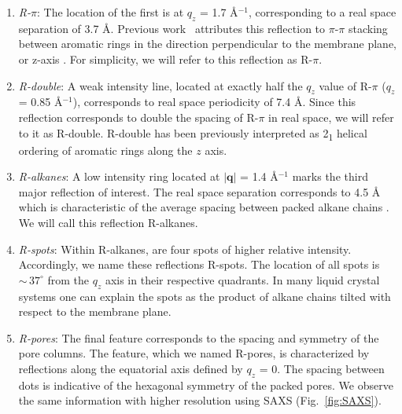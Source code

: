 \documentclass[journal=jpcbfk,manuscript=article]{achemso}
\begin{document}
  \begin{enumerate} 
  
	\item \textit{R-$\pi$}: The location of the first is at $q_z$ = 1.7
	\AA$^{-1}$, corresponding to a real space separation of 3.7 {\AA}. Previous
	work~\cite{feng_scalable_2014} attributes this reflection to $\pi$-$\pi$
	stacking between aromatic rings in the direction perpendicular to the membrane
	plane, or z-axis \cite{feng_scalable_2014}. For simplicity, we will refer to
	this reflection as R-$\pi$.
 
	\item \textit{R-double}: A weak intensity line, located at exactly half
	the $q_z$ value of R-$\pi$ ($q_z$ = 0.85 \AA$^{-1}$), corresponds to real
	space periodicity of 7.4 \AA. Since this reflection corresponds to double
	the spacing of R-$\pi$ in real space, we will refer to it as R-double. 
	R-double has been previously interpreted as 2\textsubscript{1} helical ordering of aromatic
	rings along the $z$ axis\cite{feng_scalable_2014}.

	\item \textit{R-alkanes}: A low intensity ring located at $|\mathbf{q}|$ = 1.4
	\AA$^{-1}$ marks the third major reflection of interest. The real space
	separation corresponds to 4.5 \AA~ which is characteristic of the average
	spacing between packed alkane chains \cite{mcintosh_organization_1980}. We will
	call this reflection R-alkanes.

	\item \textit{R-spots}: Within R-alkanes, are four spots of higher
	relative intensity.  Accordingly, we name these reflections R-spots. The
	location of all spots is $\sim\,37^{\circ}$ from the $q_z$ axis in their
	respective quadrants. In many liquid crystal systems one can explain the spots
	as the product of alkane chains tilted with respect to the membrane
	plane\cite{govind_simple_2001}.
 
	\item \textit{R-pores}: The final feature corresponds to the spacing
	and symmetry of the pore columns. 
	The feature, which we named R-pores, is characterized by reflections along the
	equatorial axis defined by $q_z$ = 0. The spacing between dots is indicative of
	the hexagonal symmetry of the packed pores. We observe the same information
	with higher resolution using SAXS (Fig.~\ref{fig:SAXS}). 

  \end{enumerate}
\end{document}
